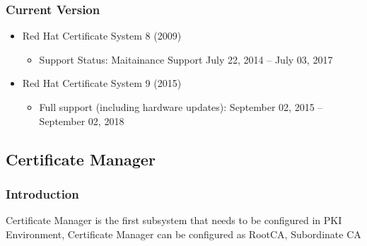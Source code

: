 \documentclass[a4paper]{article}
\begin{document}
    \subsubsection{Current Version}
        \begin{itemize}
            \item Red Hat Certificate System 8 (2009) 
                \begin{itemize}
                    \item Support Status: Maitainance Support July 22, 2014 – July 03, 2017 
                \end{itemize}
            \item Red Hat Certificate System 9 (2015)
                \begin{itemize}
                    \item Full support (including hardware updates): September 02, 2015 – September 02, 2018
                \end{itemize}
        \end{itemize}
\subsection{Certificate Manager}
\subsubsection{Introduction}
Certificate Manager is the first subsystem that needs to be configured in PKI Environment, Certificate Manager can be configured as RootCA, Subordinate CA
\end{document}
